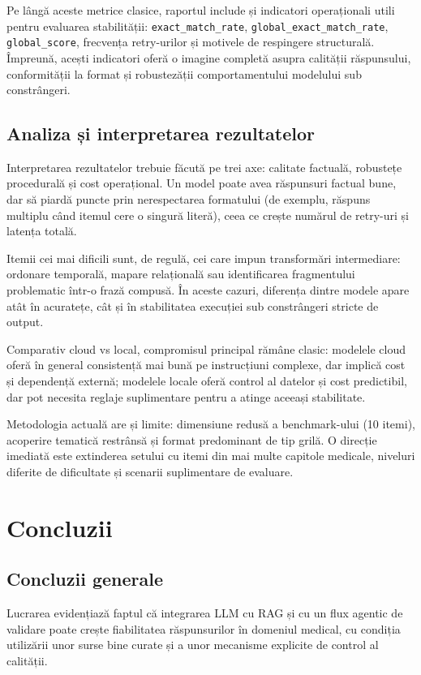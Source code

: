 \documentclass[12pt, a4paper, oneside, romanian]{teza-upb}
\begin{document}
Pe lângă aceste metrice clasice, raportul include și indicatori operaționali utili pentru evaluarea stabilității: \texttt{exact\_match\_rate}, \texttt{global\_exact\_match\_rate}, \texttt{global\_score}, frecvența retry-urilor și motivele de respingere structurală. Împreună, acești indicatori oferă o imagine completă asupra calității răspunsului, conformității la format și robustezății comportamentului modelului sub constrângeri.

\section{Analiza și interpretarea rezultatelor}

Interpretarea rezultatelor trebuie făcută pe trei axe: calitate factuală, robustețe procedurală și cost operațional. Un model poate avea răspunsuri factual bune, dar să piardă puncte prin nerespectarea formatului (de exemplu, răspuns multiplu când itemul cere o singură literă), ceea ce crește numărul de retry-uri și latența totală.

Itemii cei mai dificili sunt, de regulă, cei care impun transformări intermediare: ordonare temporală, mapare relațională sau identificarea fragmentului problematic într-o frază compusă. În aceste cazuri, diferența dintre modele apare atât în acuratețe, cât și în stabilitatea execuției sub constrângeri stricte de output.

Comparativ cloud vs local, compromisul principal rămâne clasic: modelele cloud oferă în general consistență mai bună pe instrucțiuni complexe, dar implică cost și dependență externă; modelele locale oferă control al datelor și cost predictibil, dar pot necesita reglaje suplimentare pentru a atinge aceeași stabilitate.

Metodologia actuală are și limite: dimensiune redusă a benchmark-ului (10 itemi), acoperire tematică restrânsă și format predominant de tip grilă. O direcție imediată este extinderea setului cu itemi din mai multe capitole medicale, niveluri diferite de dificultate și scenarii suplimentare de evaluare.

\chapter{Concluzii}
\section{Concluzii generale}
Lucrarea evidențiază faptul că integrarea LLM cu RAG și cu un flux agentic de validare poate crește fiabilitatea răspunsurilor în domeniul medical, cu condiția utilizării unor surse bine curate și a unor mecanisme explicite de control al calității.
\end{document}
